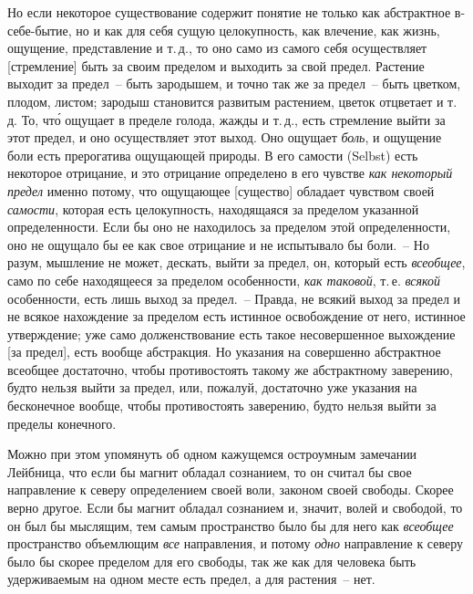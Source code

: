 Но если некоторое существование содержит понятие
не только как абстрактное в-себе-бытие, но и как для себя
сущую целокупность, как влечение, как жизнь, ощущение,
представление и т.\,д., то оно само из самого себя осуществляет
[стремление] быть за своим пределом и выходить
за свой предел. Растение выходит за предел~-- быть
зародышем, и точно так же за предел~-- быть цветком, плодом,
листом; зародыш становится развитым растением,
цветок отцветает и т.\,д. То, чт\'о ощущает в пределе голода,
жажды и т.\,д., есть стремление выйти за этот предел,
и оно осуществляет этот выход. Оно ощущает \emph{боль}, и
ощущение боли есть прерогатива ощущающей природы.
В его самости (Selbst) есть некоторое отрицание, и это
отрицание определено в его чувстве \emph{как некоторый предел}
именно потому, что ощущающее [существо] обладает
чувством своей \emph{самости}, которая есть целокупность, находящаяся
за пределом указанной определенности. Если бы
оно не находилось за пределом этой определенности, оно
не ощущало бы ее как свое отрицание и не испытывало
бы боли.~-- Но разум, мышление не может, дескать, выйти
за предел, он, который есть \emph{всеобщее}, само по себе находящееся
за пределом особенности, \emph{как таковой}, т.\,е.
\emph{всякой} особенности, есть лишь выход за предел.~-- Правда,
не всякий выход за предел и не всякое нахождение за
пределом есть истинное освобождение от него, истинное
утверждение; уже само долженствование есть такое несовершенное
выхождение [за предел], есть вообще абстракция.
Но указания на совершенно абстрактное всеобщее
достаточно, чтобы противостоять такому же абстрактному
заверению, будто нельзя выйти за предел, или, пожалуй,
достаточно уже указания на бесконечное вообще,
чтобы противостоять заверению, будто нельзя выйти за
пределы конечного.

Можно при этом упомянуть об одном кажущемся остроумным
замечании Лейбница, что если бы магнит обладал
сознанием, то он считал бы свое направление к северу
определением своей воли, законом своей свободы\endnotemark{}. Скорее
верно другое. Если бы магнит обладал сознанием и, значит,
волей и свободой, то он был бы мыслящим, тем самым
пространство было бы для него как \emph{всеобщее} пространство
объемлющим \emph{все} направления, и потому \emph{одно}
направление к северу было бы скорее пределом для его
свободы, так же как для человека быть удерживаемым
на одном месте есть предел, а для растения~-- нет.


